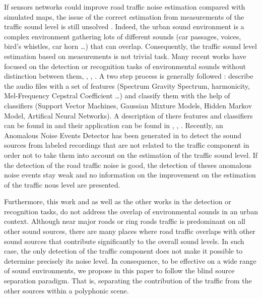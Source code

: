 \documentclass[twocolumn,a4paper,10pt]{article}
\begin{document}
If sensors networks could improve road traffic noise estimation compared with simulated maps, the issue of the correct estimation from  measurements of the traffic sound level is still unsolved \cite{Mioduszewski}. Indeed, the urban sound environment is a complex environment gathering lots of different sounds (car passages, voices, bird's whistles, car horn \dots) that can overlap. Consequently, the traffic sound level estimation based on measurements is not trivial task.
Many recent works have focused on the detection or recognition tasks of environmental sounds without distinction between them\cite{heittola_sound_2011}, \cite{defreville_automatic_2006}, \cite{dufaux_automatic_2000}, \cite{chu_environmental_2009}. A two step process is generally followed : describe the audio files with a set of features (Spectrum Gravity Spectrum, harmonicity, Mel-Frequency Cepstral Coefficient \dots) and classify them with the help of classifiers (Support Vector Machines, Gaussian Mixture Models, Hidden Markov Model, Artifical Neural Networks). A description of there features and classifiers can be found in \cite{cowling_comparison_2003} and their application can be found in \cite{shen_environmental_2012}, \cite{beritelli_pattern_2008}, \cite{couvreur_automatic_2004}. Recently, an Anomalous Noise Events Detector has been generated in \cite{socoro_anomalous_2017} to detect the sound sources from labeled recordings that are not related to the traffic component in order not to take them into account on the estimation of the traffic sound level. If the detection of the road traffic noise is good, the detection of theses anomalous noise events stay weak and no information on the improvement on the estimation of the traffic nous level are presented.

Furthermore, this work and as well as the other works in the detection or recognition tasks, do not address the overlap of environmental sounds in an urban context. Although near major roads or ring roads traffic is predominant on all other sound sources, there are many places where road traffic overlaps with other sound sources that contribute significantly to the overall sound levels. In such case, the only detection of the traffic component does not make it possible to determine precisely its noise level. In consequence, to be effective on a wide range of sound environments, we propose in this paper to follow the blind source separation paradigm. That is, separating the contribution of the traffic from the other sources within a polyphonic scene.
\end{document}
